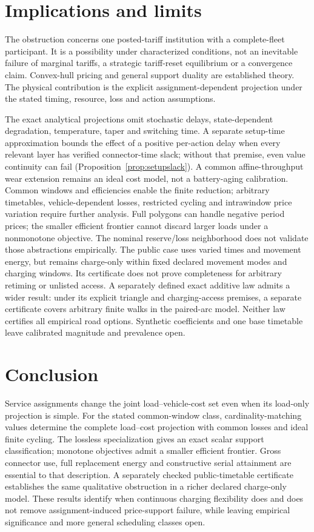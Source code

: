 \documentclass[11pt]{article}
\theoremstyle{definition}\newtheorem{definition}[theorem]{Definition}
\theoremstyle{remark}\newtheorem{remark}[theorem]{Remark}
\begin{document}




\section{Implications and limits}
The obstruction concerns one posted-tariff institution with a complete-fleet
participant. It is a possibility under characterized conditions, not an
inevitable failure of marginal tariffs, a strategic tariff-reset equilibrium
or a convergence claim. Convex-hull pricing and general support duality are
established theory. The physical contribution is the explicit assignment-dependent
projection under the stated timing, resource, loss and action assumptions.

The exact analytical projections omit stochastic delays, state-dependent
degradation, temperature, taper and switching time. A separate setup-time
approximation bounds the effect of a positive per-action delay when every
relevant layer has verified connector-time slack; without that premise,
even value continuity can fail (Proposition~\ref{prop:setupslack}).
A common affine-throughput wear
extension remains an ideal cost model, not a battery-aging calibration.
Common windows and efficiencies enable the finite
reduction; arbitrary timetables, vehicle-dependent losses, restricted cycling
and intrawindow price variation require further analysis. Full polygons can
handle negative period prices; the smaller efficient frontier cannot discard
larger loads under a nonmonotone objective. The nominal reserve/loss neighborhood
does not validate those abstractions empirically. The public case uses varied
times and movement energy, but remains charge-only within fixed declared
movement modes and charging windows. Its certificate does not prove
completeness for arbitrary retiming or unlisted access. A separately defined
exact additive law admits a wider result: under its explicit triangle
and charging-access premises, a separate certificate covers arbitrary finite
walks in the paired-arc model. Neither law certifies all empirical road options.
Synthetic coefficients and one base timetable leave calibrated magnitude
and prevalence open.

\section{Conclusion}
Service assignments change the joint load--vehicle-cost set even when its
load-only projection is simple. For the stated common-window class,
cardinality-matching values determine the complete load--cost projection
with common losses and ideal finite cycling. The lossless specialization
gives an exact scalar support classification; monotone objectives admit a
smaller efficient frontier. Gross
connector use, full replacement energy and constructive serial attainment are
essential to that description. A separately checked public-timetable certificate establishes
the same qualitative obstruction in a richer declared charge-only model.
These results identify when continuous charging flexibility does and does
not remove assignment-induced price-support failure, while leaving empirical
significance and more general scheduling classes open.
\end{document}
